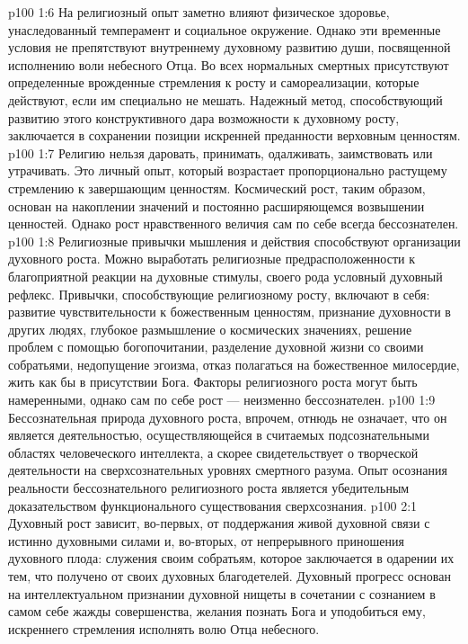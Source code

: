 \vs p100 1:6 \pc На религиозный опыт заметно влияют физическое здоровье, унаследованный темперамент и социальное окружение. Однако эти временные условия не препятствуют внутреннему духовному развитию души, посвященной исполнению воли небесного Отца. Во всех нормальных смертных присутствуют определенные врожденные стремления к росту и самореализации, которые действуют, если им специально не мешать. Надежный метод, способствующий развитию этого конструктивного дара возможности к духовному росту, заключается в сохранении позиции искренней преданности верховным ценностям.
\vs p100 1:7 Религию нельзя даровать, принимать, одалживать, заимствовать или утрачивать. Это личный опыт, который возрастает пропорционально растущему стремлению к завершающим ценностям. Космический рост, таким образом, основан на накоплении значений и постоянно расширяющемся возвышении ценностей. Однако рост нравственного величия сам по себе всегда бессознателен.
\vs p100 1:8 Религиозные привычки мышления и действия способствуют организации духовного роста. Можно выработать религиозные предрасположенности к благоприятной реакции на духовные стимулы, своего рода условный духовный рефлекс. Привычки, способствующие религиозному росту, включают в себя: развитие чувствительности к божественным ценностям, признание духовности в других людях, глубокое размышление о космических значениях, решение проблем с помощью богопочитании, разделение духовной жизни со своими собратьями, недопущение эгоизма, отказ полагаться на божественное милосердие, жить как бы в присутствии Бога. Факторы религиозного роста могут быть намеренными, однако сам по себе рост --- неизменно бессознателен.
\vs p100 1:9 Бессознательная природа духовного роста, впрочем, отнюдь не означает, что он является деятельностью, осуществляющейся в считаемых подсознательными областях человеческого интеллекта, а скорее свидетельствует о творческой деятельности на сверхсознательных уровнях смертного разума. Опыт осознания реальности бессознательного религиозного роста является убедительным доказательством функционального существования сверхсознания.
\vs p100 2:1 Духовный рост зависит, во\hyp{}первых, от поддержания живой духовной связи с истинно духовными силами и, во\hyp{}вторых, от непрерывного приношения духовного плода: служения своим собратьям, которое заключается в одарении их тем, что получено от своих духовных благодетелей. Духовный прогресс основан на интеллектуальном признании духовной нищеты в сочетании с сознанием в самом себе жажды совершенства, желания познать Бога и уподобиться ему, искреннего стремления исполнять волю Отца небесного.
